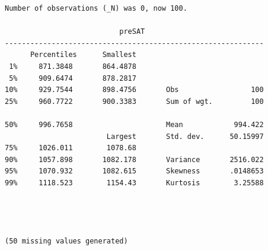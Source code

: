 \documentclass[
]{book}
\begin{document}
\begin{verbatim}
Number of observations (_N) was 0, now 100.

                           preSAT
-------------------------------------------------------------
      Percentiles      Smallest
 1%     871.3848       864.4878
 5%     909.6474       878.2817
10%     929.7544       898.4756       Obs                 100
25%     960.7722       900.3383       Sum of wgt.         100

50%     996.7658                      Mean            994.422
                        Largest       Std. dev.      50.15997
75%     1026.011        1078.68
90%     1057.898       1082.178       Variance       2516.022
95%     1070.932       1082.615       Skewness       .0148653
99%     1118.523        1154.43       Kurtosis        3.25588




(50 missing values generated)


\end{verbatim}
\end{document}
